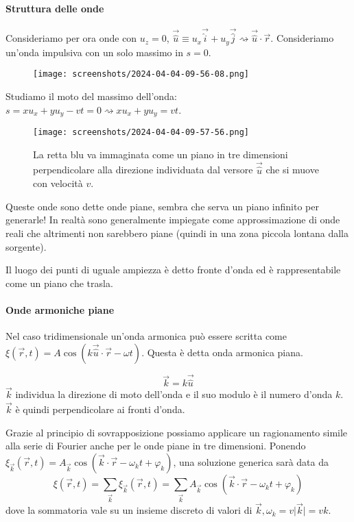 \paragraph{Struttura delle onde}
Consideriamo per ora onde con \(u_z = 0\), \(\vec{\hat{u}} \equiv u_x \vec{\hat{i}} + u_y \vec{\hat{j}} \rightsquigarrow \vec{\hat{u}} \cdot \vec{r}\). Consideriamo un'onda impulsiva con un solo massimo in \(s=0\).
\begin{figure}[H]
	\centering
	\texttt{[image: screenshots/2024-04-04-09-56-08.png]}
\end{figure}
Studiamo il moto del massimo dell'onda: \(s=xu_x + yu_y - vt = 0 \rightsquigarrow xu_x + yu_y = vt\).
\begin{figure}[H]
	\centering
	\texttt{[image: screenshots/2024-04-04-09-57-56.png]}
	\caption{La retta blu va immaginata come un piano in tre dimensioni perpendicolare alla direzione individuata dal versore \(\vec{\hat{u}} \) che si muove con velocità \(v\).}
\end{figure}
Queste onde sono dette onde piane, sembra che serva un piano infinito per generarle! In realtà sono generalmente impiegate come approssimazione di onde reali che altrimenti non sarebbero piane (quindi in una zona piccola lontana dalla sorgente).
\begin{definition}
	Il luogo dei punti di uguale ampiezza è detto fronte d'onda ed è rappresentabile come un piano che trasla.
\end{definition}

\paragraph{Onde armoniche piane}
Nel caso tridimensionale un'onda armonica può essere scritta come \(\xi (\vec{r},t ) = A \cos (k \vec{\hat{u}} \cdot \vec{r} - \omega t)\). Questa è detta onda armonica piana.
\begin{definition}
	\[
		\vec{k} = k \vec{\hat{u}} 
	\]
	\(\vec{k}\) individua la direzione di moto dell'onda e il suo modulo è il numero d'onda \(k\). \(\vec{k}\) è quindi perpendicolare ai fronti d'onda.
\end{definition}
Grazie al principio di sovrapposizione possiamo applicare un ragionamento simile alla serie di Fourier anche per le onde piane in tre dimensioni. Ponendo \(\xi _{\vec{k}}(\vec{r}, t) = A_{\vec{k}}\cos (\vec{k}\cdot \vec{r} - \omega _k t + \varphi _k )\), una soluzione generica sarà data da
\[
	\xi (\vec{r}, t)= \sum_{\vec{k}}\xi _{\vec{k}}(\vec{r},t) = \sum_{\vec{k}}A_{\vec{k}} \cos (\vec{k}\cdot \vec{r} - \omega _k t + \varphi _k )  
\]
dove la sommatoria vale su un insieme discreto di valori di \(\vec{k}, \omega _k = v \vert \vec{k} \vert = vk\).